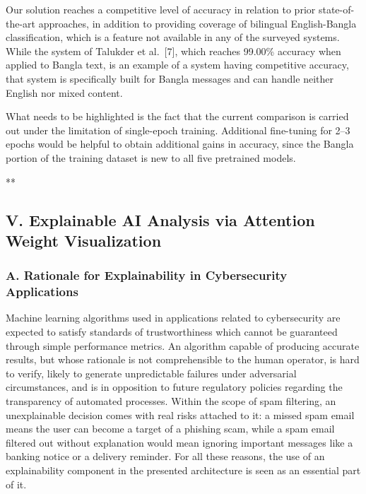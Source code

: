 Our solution reaches a competitive level of accuracy in relation to
prior state-of-the-art approaches, in addition to providing coverage of
bilingual English-Bangla classification, which is a feature not
available in any of the surveyed systems. While the system of Talukder
et al.~{[}7{]}, which reaches 99.00\% accuracy when applied to Bangla
text, is an example of a system having competitive accuracy, that system
is specifically built for Bangla messages and can handle neither English
nor mixed content.

What needs to be highlighted is the fact that the current comparison is
carried out under the limitation of single-epoch training. Additional
fine-tuning for 2--3 epochs would be helpful to obtain additional gains
in accuracy, since the Bangla portion of the training dataset is new to
all five pretrained models.

**

\subsection{V. Explainable AI Analysis via Attention Weight
Visualization}\label{v.-explainable-ai-analysis-via-attention-weight-visualization}

\subsubsection{A. Rationale for Explainability in Cybersecurity
Applications}\label{a.-rationale-for-explainability-in-cybersecurity-applications}

Machine learning algorithms used in applications related to
cybersecurity are expected to satisfy standards of trustworthiness which
cannot be guaranteed through simple performance metrics. An algorithm
capable of producing accurate results, but whose rationale is not
comprehensible to the human operator, is hard to verify, likely to
generate unpredictable failures under adversarial circumstances, and is
in opposition to future regulatory policies regarding the transparency
of automated processes. Within the scope of spam filtering, an
unexplainable decision comes with real risks attached to it: a missed
spam email means the user can become a target of a phishing scam, while
a spam email filtered out without explanation would mean ignoring
important messages like a banking notice or a delivery reminder. For all
these reasons, the use of an explainability component in the presented
architecture is seen as an essential part of it.

